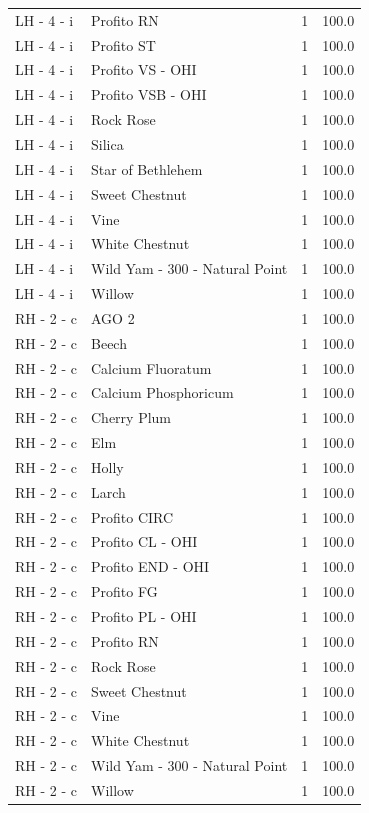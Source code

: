 \documentclass[a4paper,11pt]{article}
\begin{document}
\begin{footnotesize}
\begin{longtable}{p{3.5cm}p{7.5cm}rr}
LH - 4 - i & Profito RN & 1 & 100.0 \\
LH - 4 - i & Profito ST & 1 & 100.0 \\
LH - 4 - i & Profito VS - OHI & 1 & 100.0 \\
LH - 4 - i & Profito VSB - OHI & 1 & 100.0 \\
LH - 4 - i & Rock Rose & 1 & 100.0 \\
LH - 4 - i & Silica & 1 & 100.0 \\
LH - 4 - i & Star of Bethlehem & 1 & 100.0 \\
LH - 4 - i & Sweet Chestnut & 1 & 100.0 \\
LH - 4 - i & Vine & 1 & 100.0 \\
LH - 4 - i & White Chestnut & 1 & 100.0 \\
LH - 4 - i & Wild Yam - 300  - Natural Point & 1 & 100.0 \\
LH - 4 - i & Willow & 1 & 100.0 \\
RH - 2 - c & AGO 2 & 1 & 100.0 \\
RH - 2 - c & Beech & 1 & 100.0 \\
RH - 2 - c & Calcium Fluoratum & 1 & 100.0 \\
RH - 2 - c & Calcium Phosphoricum & 1 & 100.0 \\
RH - 2 - c & Cherry Plum & 1 & 100.0 \\
RH - 2 - c & Elm & 1 & 100.0 \\
RH - 2 - c & Holly & 1 & 100.0 \\
RH - 2 - c & Larch & 1 & 100.0 \\
RH - 2 - c & Profito CIRC & 1 & 100.0 \\
RH - 2 - c & Profito CL - OHI & 1 & 100.0 \\
RH - 2 - c & Profito END - OHI & 1 & 100.0 \\
RH - 2 - c & Profito FG & 1 & 100.0 \\
RH - 2 - c & Profito PL - OHI & 1 & 100.0 \\
RH - 2 - c & Profito RN & 1 & 100.0 \\
RH - 2 - c & Rock Rose & 1 & 100.0 \\
RH - 2 - c & Sweet Chestnut & 1 & 100.0 \\
RH - 2 - c & Vine & 1 & 100.0 \\
RH - 2 - c & White Chestnut & 1 & 100.0 \\
RH - 2 - c & Wild Yam - 300  - Natural Point & 1 & 100.0 \\
RH - 2 - c & Willow & 1 & 100.0 \\
\end{longtable}
\end{footnotesize}
\end{document}
